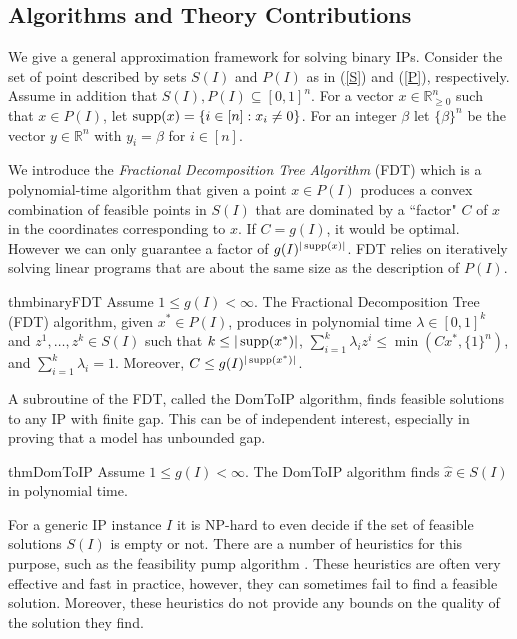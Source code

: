 \subsection{Algorithms and Theory Contributions} 
 
We give a general approximation framework for solving binary IPs.  Consider the set of point described by sets $S(I)$ and $P(I)$ as in (\ref{S}) and (\ref{P}), respectively. Assume in addition that $S(I),P(I)\subseteq [0,1]^n$.  For a vector $x\in \mathbb{R}_{\geq 0}^n$ such that $x\in P(I)$, let $\operatorname{supp}(x)= \{i \in [n]: x_i \neq 0\}$. For an integer $\beta$ let $\{\beta\}^n$ be the vector $y\in \mathbb{R}^n$ with $y_i=\beta$ for $i\in [n]$.


We introduce the \textit{Fractional Decomposition Tree Algorithm} (FDT) which is a polynomial-time algorithm that given a point $x\in P(I)$ produces a convex combination of feasible points in $S(I)$ that are dominated by a ``factor" $C$ of $x$ in the coordinates corresponding to $x$. If $C = g(I)$, it would be optimal. However we can only guarantee a factor of $g(I)^{|\operatorname{supp}(x)|}$. FDT relies on iteratively solving linear programs that are about the same size as the description of $P(I)$.

\begin{restatable}{thm}{binaryFDT}
	\label{binaryFDT}
	Assume $1\leq g(I) 	<\infty$. 	
	The Fractional Decomposition Tree (FDT) algorithm, given $x^*\in P(I)$, produces in polynomial time $\lambda\in [0,1]^k$ and $z^1,\ldots,z^k \in S(I)$ such that $k\leq |\operatorname{supp}(x^*)|$, $\sum_{i=1}^{k}\lambda_i z^i\leq \min(Cx^*,\{1\}^{n})$, and $\sum_{i=1}^{k}\lambda_i = 1$. Moreover, $C\leq g(I)^{|\operatorname{supp}(x^*)|}$.
\end{restatable}

A subroutine of the FDT, called the DomToIP algorithm, finds feasible solutions to any IP with finite gap. This can be of independent interest, especially in proving that a model has unbounded gap.
\begin{restatable}{thm}{DomToIP}
	\label{domtoIP}
	Assume $1\leq g(I) < \infty$. The DomToIP algorithm finds $\hat{x}\in S(I)$ in polynomial time.
\end{restatable}

For a generic IP instance $I$ it is NP-hard to even decide if the set of feasible solutions $S(I)$ is empty or not. There are a number of heuristics for this purpose, such as the feasibility pump algorithm \cite{fp1,fp2}. These heuristics are often very effective and fast in practice, however, they can sometimes fail to find a feasible solution. Moreover, these heuristics do not provide any bounds on the quality of the solution they find. 

